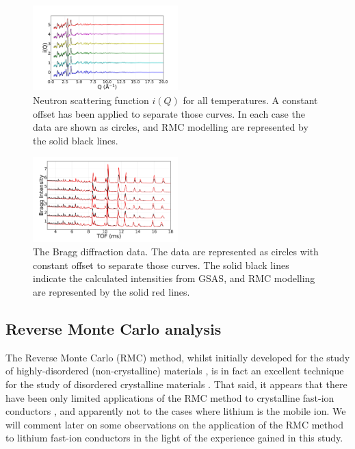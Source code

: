 \documentclass[twoside,twocolumn,9pt]{article}
\begin{document}
\begin{figure}[t]
\centering
\includegraphics[width=0.5\textwidth]{Pics/nsoq.pdf}
\caption{Neutron scattering function $i(Q)$ for all temperatures.
A constant offset has been applied to separate those curves.
In each case the data are shown as circles,
and RMC modelling are represented by the solid black lines.}
\label{fig:nsoq}
\end{figure}

\begin{figure}[t]
\centering
\includegraphics[width=0.5\textwidth]{Pics/bragg.pdf}
\caption{The Bragg diffraction data. The data are represented as circles with constant offset to separate those curves.
The solid black lines indicate the  calculated intensities from GSAS, and RMC modelling are represented by the solid red lines. }
\label{fig:Rietveld_refinement}
\end{figure}

\subsection{Reverse Monte Carlo analysis}

The Reverse Monte Carlo (RMC) method, whilst initially developed for the study of highly-disordered (non-crystalline) materials \cite{McGreevy:1988bu}, is in fact an excellent technique for the study of disordered crystalline materials \cite{Keen:2005dd}. That said, it appears that there have been only limited applications of the RMC method to crystalline fast-ion conductors \cite{Adams:2000ez, Swenson:2001if, Adams:2002ga,Adams:2005ds}, and apparently not to the cases where lithium is the mobile ion. We will comment later on some observations on the application of the RMC method to lithium fast-ion conductors in the light of the experience gained in this study.
\end{document}
